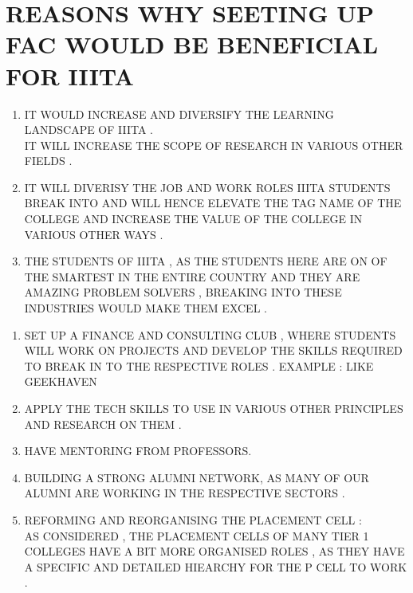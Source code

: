 \documentclass{article}
\begin{document}
\section{REASONS WHY SEETING UP FAC WOULD BE BENEFICIAL FOR IIITA }
\begin{enumerate}
    \item IT WOULD INCREASE AND DIVERSIFY THE LEARNING LANDSCAPE OF IIITA . \\
IT WILL INCREASE THE SCOPE OF RESEARCH IN VARIOUS OTHER FIELDS . 
    \item IT WILL DIVERISY THE JOB AND WORK ROLES IIITA STUDENTS BREAK INTO AND WILL HENCE ELEVATE THE TAG NAME OF THE COLLEGE AND INCREASE THE VALUE OF THE COLLEGE IN VARIOUS OTHER WAYS . 
    \item THE STUDENTS OF IIITA , AS THE STUDENTS HERE ARE ON OF THE SMARTEST IN THE ENTIRE COUNTRY AND THEY ARE AMAZING PROBLEM SOLVERS , BREAKING INTO THESE INDUSTRIES WOULD MAKE THEM EXCEL . 
\end{enumerate}
\begin{enumerate}
    \item SET UP A FINANCE AND CONSULTING CLUB , WHERE STUDENTS WILL WORK ON PROJECTS AND DEVELOP THE SKILLS REQUIRED TO BREAK IN TO THE RESPECTIVE ROLES . EXAMPLE : LIKE GEEKHAVEN 
    \item APPLY THE TECH SKILLS TO USE IN VARIOUS OTHER PRINCIPLES AND RESEARCH ON THEM .
    \item HAVE MENTORING FROM  PROFESSORS. 
    \item BUILDING A STRONG ALUMNI NETWORK, AS MANY OF OUR ALUMNI ARE WORKING IN THE RESPECTIVE SECTORS . 
    \item REFORMING AND REORGANISING THE PLACEMENT CELL : 
\\ AS CONSIDERED , THE PLACEMENT CELLS OF MANY TIER 1 COLLEGES HAVE A BIT MORE ORGANISED ROLES , AS THEY HAVE A SPECIFIC AND DETAILED HIEARCHY FOR THE P CELL TO WORK . 

\end{enumerate}
\end{document}
